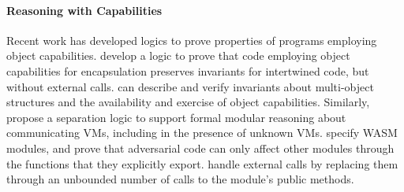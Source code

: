 

\paragraph{Reasoning with Capabilities}
%
 Recent work has developed logics to prove properties of programs employing object capabilities.
\citet{ddd} develop a logic to prove that code employing object
capabilities for encapsulation preserves invariants for
intertwined code, but without external calls. 
  \citet{dd}  can describe and verify invariants
about multi-object structures and the availability and exercise of object capabilities.  %
 Similarly,
{\citet{vmsl-pldi2023} propose a separation logic to support formal modular reasoning about communicating VMs, including in the presence of unknown VMs.
\citet{irisWasm23} specify WASM modules, %
and prove that adversarial code  can only affect other modules through the functions} that they explicitly export. 
\citet{CassezFQ24}  handle external calls by replacing them through an unbounded number of calls to the module's public methods.
 
